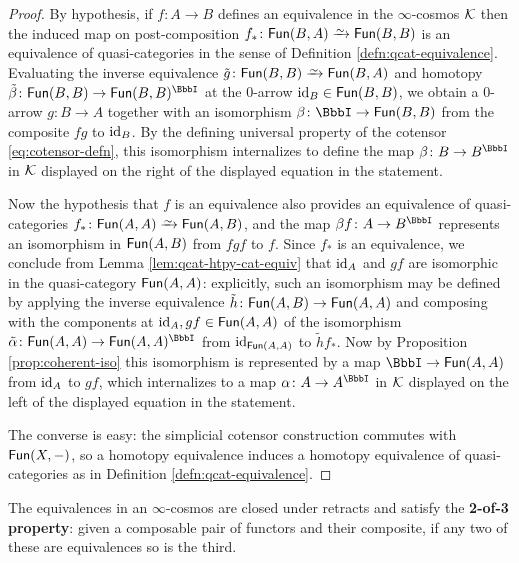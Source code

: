\begin{proof}
By hypothesis, if $f \colon A \to B$ defines an equivalence in the $\infty$-cosmos ${\mathord{\mathcal{K}}}$ then the induced map on post-composition $f_* \colon \Fun(B,A) \we \Fun(B,B)$ is an equivalence of quasi-categories in the sense of Definition \ref{defn:qcat-equivalence}. Evaluating the inverse equivalence $\tilde{g} \colon \Fun(B,B) \we \Fun(B,A)$ and homotopy $\tilde{\beta} \colon \Fun(B,B) \to \Fun(B,B)^\iso$ at the 0-arrow $\textup{id}_B \in {\mathord{\mathsf{Fun}}}(B,B)$, we obtain a 0-arrow $g \colon B \to A$ together with an isomorphism $\beta \colon \iso\to\Fun(B,B)$ from the composite $fg$ to $\textup{id}_B$. By the defining universal property of the cotensor \eqref{eq:cotensor-defn}, this isomorphism internalizes to define the map $\beta \colon B \to B^\iso$ in ${\mathord{\mathcal{K}}}$ displayed on the right of the displayed equation in the statement.

Now the hypothesis that $f$ is an equivalence also provides an equivalence of quasi-categories $f_* \colon \Fun(A,A) \we \Fun(A,B)$, and the map $\beta f \colon A \to B^\iso$ represents an isomorphism in ${\mathord{\mathsf{Fun}}}(A,B)$ from $fgf$ to $f$. Since $f_*$ is an equivalence, we conclude from Lemma \ref{lem:qcat-htpy-cat-equiv} that $\textup{id}_A$ and $gf$ are isomorphic in the quasi-category ${\mathord{\mathsf{Fun}}}(A,A)$: explicitly, such an isomorphism may be defined by applying the inverse equivalence $\tilde{h} \colon {\mathord{\mathsf{Fun}}}(A,B) \to {\mathord{\mathsf{Fun}}}(A,A)$ and composing with the components at $\textup{id}_A, gf \in {\mathord{\mathsf{Fun}}}(A,A)$ of the isomorphism $\tilde{\alpha} \colon \Fun(A,A) \to \Fun(A,A)^\iso$ from $\textup{id}_{{\mathord{\mathsf{Fun}}}(A,A)}$ to $\tilde{h}f_*$. Now by Proposition \ref{prop:coherent-iso} this isomorphism is represented by a map $\iso \to \Fun(A,A)$ from $\textup{id}_A$ to $gf$, which internalizes to a map $\alpha \colon A \to A^\iso$ in ${\mathord{\mathcal{K}}}$ displayed on the left of the displayed equation in the statement.

The converse is easy: the simplicial cotensor construction commutes with ${\mathord{\mathsf{Fun}}}(X,-)$, so a homotopy equivalence induces a  homotopy equivalence of quasi-categories as in Definition \ref{defn:qcat-equivalence}.
\end{proof}


  \begin{lemma}\label{lem:equivalence-2-of-3}
     The equivalences in an $\infty$-cosmos are closed under retracts and satisfy the \textbf{2-of-3 property}: given a composable pair of functors and their composite, if any two of these are equivalences so is the third.
\end{lemma}



